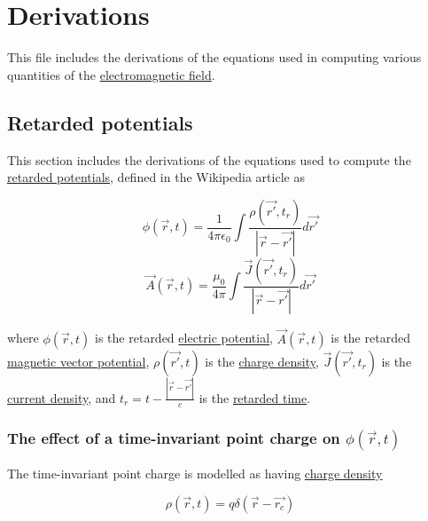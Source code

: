 ﻿\documentclass{article}
\begin{document}
\section{Derivations}

This file includes the derivations of the equations used in computing various quantities of the \href{https://en.wikipedia.org/wiki/Electromagnetic_field}{electromagnetic field}.

\subsection{Retarded potentials}

This section includes the derivations of the equations used to compute the \href{https://en.wikipedia.org/wiki/Retarded_potential}{retarded potentials}, defined in the Wikipedia article as

\begin{equation}
    \label{eq:definitionOfPhi}
    \phi(\vec{r}, t) = \frac{1}{4 \pi \epsilon_0} \int \frac{\rho(\vec{r'}, t_r)}{|\vec{r} - \vec{r'}|} d \vec{r'}
\end{equation}
\begin{equation}
    \label{eq:definitionOfA}
    \vec{A}(\vec{r}, t) = \frac{\mu_0}{4 \pi} \int \frac{\vec{J}(\vec{r'}, t_r)}{|\vec{r} - \vec{r'}|} d \vec{r'}
\end{equation}

where $\phi(\vec{r}, t)$ is the retarded \href{https://en.wikipedia.org/wiki/Electric_potential}{electric potential}, $\vec{A}(\vec{r}, t)$ is the retarded \href{https://en.wikipedia.org/wiki/Magnetic_vector_potential}{magnetic vector potential}, $\rho(\vec{r'}, t)$ is the \href{https://en.wikipedia.org/wiki/Charge_density}{charge density}, $\vec{J}(\vec{r'}, t_r)$ is the \href{https://en.wikipedia.org/wiki/Current_density}{current density}, and $t_r = t - \frac{|\vec{r} - \vec{r'}|}{c}$ is the \href{https://en.wikipedia.org/wiki/Retarded_time}{retarded time}.

\subsubsection{The effect of a time-invariant point charge on $\phi(\vec{r}, t)$}

The time-invariant point charge is modelled as having \href{https://en.wikipedia.org/wiki/Charge_density}{charge density}

\begin{equation}
    \label{eq:chargeDensityOfAPointCharge}
    \rho(\vec{r}, t) = q \delta(\vec{r} - \vec{r_c})
\end{equation}
\end{document}
